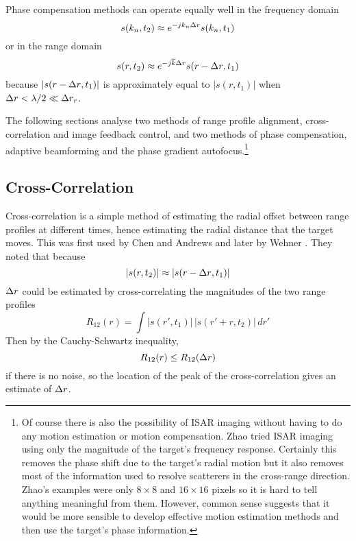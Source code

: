 Phase compensation methods can operate equally well in the frequency domain
\begin{equation}
s(k_n,t_2)\approx e^{-jk_n{\Delta r}} s(k_n,t_1)
\end{equation}
or in the range domain
\begin{equation}
s(r,t_2)\approx e^{-j\overline{k}{\Delta r}} s(r-{\Delta r},t_1)
\end{equation}
because $\left|s(r-{\Delta r},t_1)\right|$ is approximately equal to 
$\left|s(r,t_1)\right|$ when ${\Delta r}<\lambda/2\ll\Delta r_r$.  

The following sections analyse two methods of range profile alignment,
cross-correlation and image feedback control, and two methods of phase
compensation, adaptive beamforming and the phase gradient
autofocus.\footnote{Of course there is also the possibility of ISAR imaging
without having to do any motion estimation or motion compensation.  Zhao
\protect\cite{Zha92} tried ISAR imaging using only the magnitude of the
target's frequency response.  Certainly this removes the phase shift due to
the target's radial motion but it also removes most of the information used
to resolve scatterers in the cross-range direction.  Zhao's examples were
only $8\times 8$ and $16\times 16$ pixels so it is hard to tell anything
meaningful from them.  However, common sense suggests that it would be more
sensible to develop effective motion estimation methods and then use the
target's phase information.}


\subsection{Cross-Correlation}
\label{mc sec:cc}

Cross-correlation is a simple method of estimating the radial offset between
range profiles at different times, hence estimating the radial distance that
the target moves.  This was first used by Chen and Andrews \cite{Che80a} and
later by Wehner \cite{Weh87}.  They noted that because
\begin{equation}
\left|s(r,t_2)\right|\approx\left|s(r-{\Delta r},t_1)\right|
\end{equation}
${\Delta r}$ could be estimated by cross-correlating the magnitudes of the two
range profiles
\begin{equation}
R_{12}(r)=\int\left|s(r',t_1)\right|\,\left|s(r'+r,t_2)\right|\,dr'
\end{equation}
Then by the Cauchy-Schwartz inequality,
\begin{equation}
R_{12}(r)\leq R_{12}({\Delta r})
\end{equation}
if there is no noise, so the location of the peak of the cross-correlation 
gives an estimate of ${\Delta r}$.

